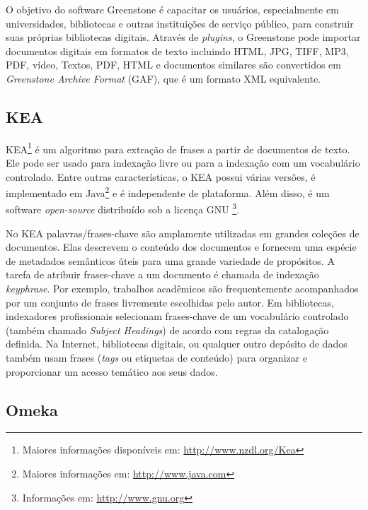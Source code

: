 O objetivo do software Greenstone é capacitar os usuários, especialmente em universidades, bibliotecas e outras instituições de serviço público, para construir suas próprias bibliotecas digitais. Através de \textit{plugins}, o Greenstone pode importar documentos digitais em formatos de texto incluindo HTML, JPG, TIFF, MP3, PDF, vídeo, Textos, PDF, HTML e documentos similares são convertidos em \textit{Greenstone Archive Format} (GAF), que é um formato XML equivalente.

\subsection{KEA}

KEA\footnote{Maiores informações disponíveis em: \url{http://www.nzdl.org/Kea}} é um algoritmo para extração de frases a partir de documentos de texto. Ele pode ser usado para indexação livre ou para a indexação com um vocabulário controlado. Entre outras características, o KEA possui várias versões, é implementado em Java\footnote{Maiores informações em: \url{http://www.java.com}} e é independente de plataforma. Além disso, é um software \textit{open-source} distribuído sob a licença GNU \footnote{Informações em: \url{http://www.gnu.org}}.

No KEA palavras/frases-chave são amplamente utilizadas em grandes coleções de documentos. Elas descrevem o conteúdo dos documentos e fornecem uma espécie de metadados semânticos úteis para uma grande variedade de propósitos. A tarefa de atribuir frases-chave a um documento é chamada de indexação \textit{keyphrase}. Por exemplo, trabalhos acadêmicos são frequentemente acompanhados por um conjunto de frases livremente escolhidas pelo autor. Em bibliotecas, indexadores profissionais selecionam frases-chave de um vocabulário controlado (também chamado \textit{Subject Headings}) de acordo com regras da catalogação definida. Na Internet, bibliotecas digitais, ou qualquer outro depósito de dados também usam frases (\textit{tags} ou etiquetas de conteúdo) para organizar e proporcionar um acesso temático aos seus dados.


\subsection{Omeka}
\label{sub:omeka}

